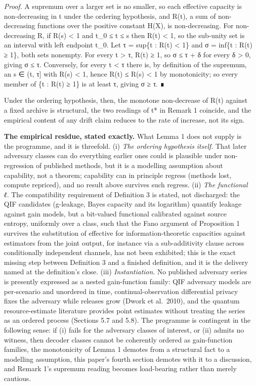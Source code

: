 \documentclass[
]{llncs}
\begin{document}
\emph{Proof.} A supremum over a larger set is no smaller, so each
effective capacity is non-decreasing in t under the ordering hypothesis,
and R(t), a sum of non-decreasing functions over the positive constant
H(X), is non-decreasing. For non-decreasing R, if R(s) \textless{} 1 and
t\_0 ≤ t ≤ s then R(t) \textless{} 1, so the sub-unity set is an
interval with left endpoint t\_0. Let τ = sup\{t : R(t) \textless{} 1\}
and σ = inf\{t : R(t) ≥ 1\}, both sets nonempty. For every t
\textgreater{} τ, R(t) ≥ 1, so σ ≤ τ + δ for every δ \textgreater{} 0,
giving σ ≤ τ. Conversely, for every t \textless{} τ there is, by
definition of the supremum, an s ∈ (t, τ{]} with R(s) \textless{} 1,
hence R(t) ≤ R(s) \textless{} 1 by monotonicity; so every member of \{t
: R(t) ≥ 1\} is at least τ, giving σ ≥ τ. ∎

Under the ordering hypothesis, then, the monotone non-decrease of R(t)
against a fixed archive is structural, the two readings of t* in Remark
1 coincide, and the empirical content of any drift claim reduces to the
rate of increase, not its sign.

\textbf{The empirical residue, stated exactly.} What Lemma 1 does not
supply is the programme, and it is threefold. (i) \emph{The ordering
hypothesis itself.} That later adversary classes can do everything
earlier ones could is plausible under non-regression of published
methods, but it is a modelling assumption about capability, not a
theorem; capability can in principle regress (methods lost, compute
repriced), and no result above survives such regress. (ii) \emph{The
functional ℓ.} The compatibility requirement of Definition 3 is stated,
not discharged: the QIF candidates (g-leakage, Bayes capacity and its
logarithm) quantify leakage against gain models, but a bit-valued
functional calibrated against source entropy, uniformly over a class,
such that the Fano argument of Proposition 1 survives the substitution
of effective for information-theoretic capacities against estimators
from the joint output, for instance via a sub-additivity clause across
conditionally independent channels, has not been exhibited; this is the
exact missing step between Definition 3 and a finished definition, and
it is the delivery named at the definition's close. (iii)
\emph{Instantiation.} No published adversary series is presently
expressed as a nested gain-function family: QIF adversary models are
per-scenario and unordered in time, continual-observation differential
privacy fixes the adversary while releases grow (Dwork et al.~2010), and
the quantum resource-estimate literature provides point estimates
without treating the series as an ordered process (Sections 5.7 and
5.8). The programme is contingent in the following sense: if (i) fails
for the adversary classes of interest, or (ii) admits no witness, then
decoder classes cannot be coherently ordered as gain-function families,
the monotonicity of Lemma 1 demotes from a structural fact to a
modelling assumption, this paper's fourth section demotes with it to a
discussion, and Remark 1's supremum reading becomes load-bearing rather
than merely cautious.
\end{document}
